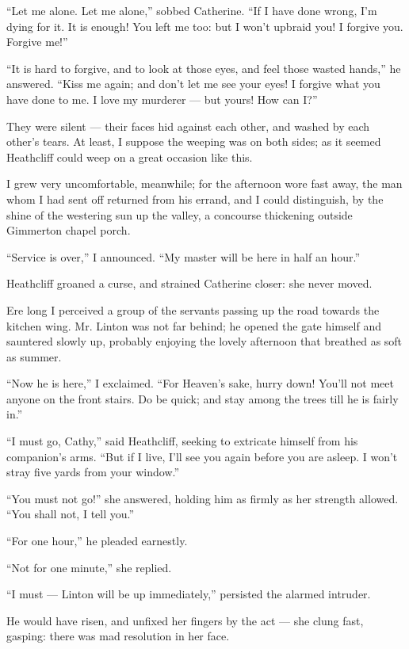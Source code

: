 \par “Let me alone. Let me alone,” sobbed Catherine. “If I have done wrong, I'm dying for it. It is enough! You left me too: but I won't upbraid you! I forgive you. Forgive me!”
\par “It is hard to forgive, and to look at those eyes, and feel those wasted hands,” he answered. “Kiss me again; and don't let me see your eyes! I forgive what you have done to me. I love my murderer — but yours! How can I?”
\par They were silent — their faces hid against each other, and washed by each other's tears. At least, I suppose the weeping was on both sides; as it seemed Heathcliff could weep on a great occasion like this.
\par I grew very uncomfortable, meanwhile; for the afternoon wore fast away, the man whom I had sent off returned from his errand, and I could distinguish, by the shine of the westering sun up the valley, a concourse thickening outside Gimmerton chapel porch.
\par “Service is over,” I announced. “My master will be here in half an hour.”
\par Heathcliff groaned a curse, and strained Catherine closer: she never moved.
\par Ere long I perceived a group of the servants passing up the road towards the kitchen wing. Mr. Linton was not far behind; he opened the gate himself and sauntered slowly up, probably enjoying the lovely afternoon that breathed as soft as summer.
\par “Now he is here,” I exclaimed. “For Heaven's sake, hurry down! You'll not meet anyone on the front stairs. Do be quick; and stay among the trees till he is fairly in.”
\par “I must go, Cathy,” said Heathcliff, seeking to extricate himself from his companion's arms. “But if I live, I'll see you again before you are asleep. I won't stray five yards from your window.”
\par “You must not go!” she answered, holding him as firmly as her strength allowed. “You shall not, I tell you.”
\par “For one hour,” he pleaded earnestly.
\par “Not for one minute,” she replied.
\par “I must — Linton will be up immediately,” persisted the alarmed intruder.
\par He would have risen, and unfixed her fingers by the act — she clung fast, gasping: there was mad resolution in her face.
